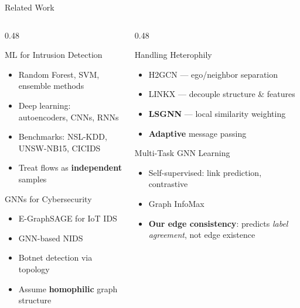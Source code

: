 \documentclass[aspectratio=169, 10pt]{beamer}
\begin{document}
\begin{frame}{Related Work}
\begin{columns}[T]
\begin{column}{0.48\textwidth}
\begin{block}{ML for Intrusion Detection}
\begin{itemize}
    \item Random Forest, SVM, ensemble methods
    \item Deep learning: autoencoders, CNNs, RNNs
    \item Benchmarks: NSL-KDD, UNSW-NB15, CICIDS
    \item[$\times$] Treat flows as \textbf{independent} samples
\end{itemize}
\end{block}
\vspace{0.2cm}
\begin{block}{GNNs for Cybersecurity}
\begin{itemize}
    \item E-GraphSAGE for IoT IDS
    \item GNN-based NIDS
    \item Botnet detection via topology
    \item[$\times$] Assume \textbf{homophilic} graph structure
\end{itemize}
\end{block}
\end{column}
\begin{column}{0.48\textwidth}
\begin{block}{Handling Heterophily}
\begin{itemize}
    \item H2GCN --- ego/neighbor separation
    \item LINKX --- decouple structure \& features
    \item \textbf{LSGNN} --- local similarity weighting
    \item[\checkmark] \textbf{Adaptive} message passing
\end{itemize}
\end{block}
\vspace{0.2cm}
\begin{block}{Multi-Task GNN Learning}
\begin{itemize}
    \item Self-supervised: link prediction, contrastive
    \item Graph InfoMax
    \item[\checkmark] \textbf{Our edge consistency}: predicts \textit{label agreement}, not edge existence
\end{itemize}
\end{block}
\end{column}
\end{columns}
\end{frame}
\end{document}
